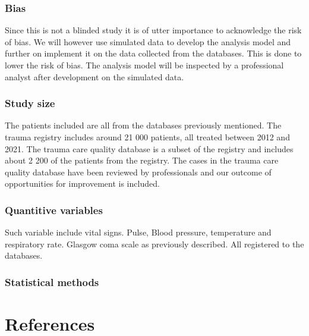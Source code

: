 \documentclass[
]{article}
\begin{document}
\hypertarget{bias}{%
\subsubsection{Bias}\label{bias}}

Since this is not a blinded study it is of utter importance to
acknowledge the risk of bias. We will however use simulated data to
develop the analysis model and further on implement it on the data
collected from the databases. This is done to lower the risk of bias.
The analysis model will be inspected by a professional analyst after
development on the simulated data.

\hypertarget{study-size}{%
\subsubsection{Study size}\label{study-size}}

The patients included are all from the databases previously mentioned.
The trauma registry includes around 21 000 patients, all treated between
2012 and 2021. The trauma care quality database is a subset of the
registry and includes about 2 200 of the patients from the registry. The
cases in the trauma care quality database have been reviewed by
professionals and our outcome of opportunities for improvement is
included.

\hypertarget{quantitive-variables}{%
\subsubsection{Quantitive variables}\label{quantitive-variables}}

Such variable include vital signs. Pulse, Blood pressure, temperature
and respiratory rate. Glasgow coma scale as previously described. All
registered to the databases.

\hypertarget{statistical-methods}{%
\subsubsection{Statistical methods}\label{statistical-methods}}

\hypertarget{references}{%
\section*{References}\label{references}}
\end{document}

